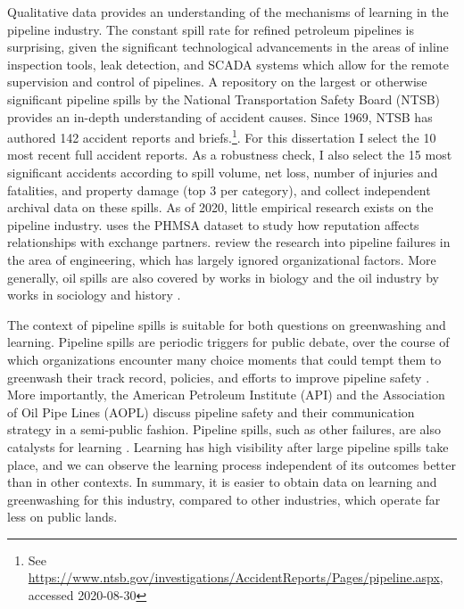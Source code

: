 Qualitative data provides an understanding of the mechanisms of learning in the pipeline industry. The constant spill rate for refined petroleum pipelines is surprising, given the significant technological advancements in the areas of inline inspection tools, leak detection, and SCADA systems which allow for the remote supervision and control of pipelines. A repository on the largest or otherwise significant pipeline spills by the National Transportation Safety Board (NTSB) provides an in-depth understanding of accident causes. Since 1969, NTSB has authored 142 accident reports and briefs.\footnote{See \url{https://www.ntsb.gov/investigations/AccidentReports/Pages/pipeline.aspx}, accessed 2020-08-30}. For this dissertation I select the 10 most recent full accident reports. As a robustness check, I also select the 15 most significant accidents according to spill volume, net loss, number of injuries and fatalities, and property damage (top 3 per category), and collect independent archival data on these spills. As of 2020, little empirical research exists on the pipeline industry. \citet{Park2019} uses the PHMSA dataset to study how reputation affects relationships with exchange partners. \citet{Zakikhani2020} review the research into pipeline failures in the area of engineering, which has largely ignored organizational factors. More generally, oil spills are also covered by works in biology \citep[in particular][]{Burger1997} and the oil industry by works in sociology and history \citep[e.g.,][]{Dochuk2019}.

The context of pipeline spills is suitable for both questions on greenwashing and learning. Pipeline spills are periodic triggers for public debate, over the course of which organizations encounter many choice moments that could tempt them to greenwash their track record, policies, and efforts to improve pipeline safety \citep{Lyon2011}. More importantly, the American Petroleum Institute (API) and the Association of Oil Pipe Lines (AOPL) discuss pipeline safety and their communication strategy in a semi-public fashion. Pipeline spills, such as other failures, are also catalysts for learning \citep{March1991}. Learning has high visibility after large pipeline spills take place, and we can observe the learning process independent of its outcomes better than in other contexts. In summary, it is easier to obtain data on learning and greenwashing for this industry, compared to other industries, which operate far less on public lands.

